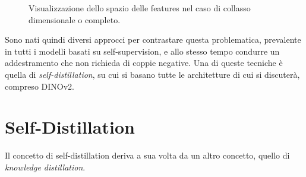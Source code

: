 \begin{figure}[t]
    \centering
    \quad
    \quad
    \caption{Visualizzazione dello spazio delle features nel caso di collasso dimensionale o completo.}
    \label{fig:collapse}
\end{figure}
\vspace{5mm}

Sono nati quindi diversi approcci per contrastare questa problematica, prevalente in tutti i modelli basati su self-supervision, e allo stesso tempo condurre un addestramento che non richieda di coppie negative. Una di queste tecniche è quella di \textit{self-distillation}, su cui si basano tutte le architetture di cui si discuterà, compreso DINOv2.

\section{Self-Distillation}
Il concetto di self-distillation deriva a sua volta da un altro concetto, quello di \textit{knowledge distillation}. 

